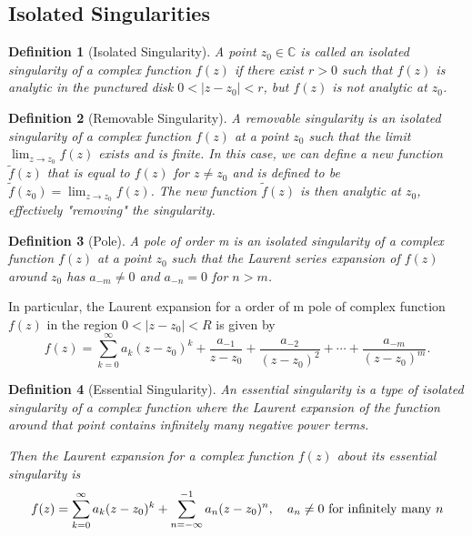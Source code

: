 \documentclass{article}
\newtheorem{definition}{Definition}[section]
\begin{document}
\subsection{Isolated Singularities}
\begin{definition}[Isolated Singularity]
    A point $z_0 \in \mathbb{C}$ is called an isolated singularity of a complex function $f(z)$ if there exist $r > 0$ such that $f(z)$ is analytic in the punctured disk $0 < |z - z_0| < r$, but $f(z)$ is not analytic at $z_0$.
\end{definition}

\begin{definition}[Removable Singularity]
    A removable singularity is an isolated singularity of a complex function $f(z)$ at a point $z_0$ such that the limit $\lim_{z \to z_0} f(z)$ exists and is finite. In this case, we can define a new function $\tilde{f}(z)$ that is equal to $f(z)$ for $z \neq z_0$ and is defined to be $\tilde{f}(z_0) = \lim_{z \to z_0} f(z)$. The new function $\tilde{f}(z)$ is then analytic at $z_0$, effectively "removing" the singularity.
\end{definition}
\begin{definition}[Pole]
  A pole of order m is an isolated singularity of a complex function $f(z)$ at a point $z_0$ such that the Laurent series expansion of $f(z)$ around $z_0$ has $a_{-m} \neq 0$ and $a_{-n} = 0$ for $n > m$.
\end{definition}

In particular, the Laurent expansion for a order of m pole of complex function $f(z)$ in the region $0 < |z-z_0| < R$ is given by
\begin{equation}
    f(z)=\sum_{k=0}^{\infty} a_{k} (z-z_0)^k + \frac{a_{-1}}{z-z_0} + \frac{a_{-2}}{(z-z_0)^2} + \cdots + \frac{a_{-m}}{(z-z_0)^m}.
\end{equation}
\begin{definition}[Essential Singularity]
  An essential singularity is a type of isolated singularity of a complex function where the Laurent expansion of the function around that point contains infinitely many negative power terms.


Then the Laurent expansion for a complex function $f(z)$ about its essential singularity is
\begin{equation}
    f(z)=\sum_{k=0}^{\infty} a_{k} (z-z_0)^k + \sum_{n=-\infty}^{-1} a_n (z-z_0)^n, \quad  a_{n} \neq 0 ~ \textup{for infinitely many }n
\end{equation}
\end{definition}
\end{document}
